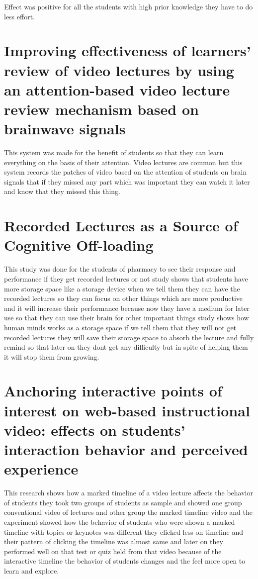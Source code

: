 \documentclass[12pt]{article}
\begin{document}
Effect was positive for all the students with high prior knowledge they have to do less effort.


\section{Improving effectiveness of learners’ review of video lectures by using an attention-based video lecture review mechanism based on brainwave signals}
This system was made for the benefit of students so that they can learn everything on the basis of their attention. Video lectures are common but this system records the patches of video based on the attention of students on brain signals that if they missed any part which was important they can watch it later and know that they missed this thing.




\section{Recorded Lectures as a Source of Cognitive Off-loading}
This study was done for the students of pharmacy to see their response and performance if they get recorded lectures or not study shows that students have more storage space like a storage device when we tell them they can have the recorded lectures so they can focus on other things which are more productive and it will increase their performance because now they have a medium for later use so that they can use their brain for other important things study shows how human minds works as a storage space if we tell them that they will not get recorded lectures they will save their storage space to absorb the lecture and fully remind so that later on they dont get any difficulty but in spite of helping them it will stop them from growing.

\section{Anchoring interactive points of interest on web-based instructional video: effects on students’ interaction behavior and perceived experience}  
This research shows how a marked timeline of a video lecture affects the behavior of students they took two groups of students as sample and showed one group conventional video of lectures and other group the marked timeline video and the experiment showed how the behavior of students who were shown a marked timeline with topics or keynotes was different they clicked less on timeline and their pattern of clicking the timeline was almost same and later on they performed well on that test or quiz held from that video because of the interactive timeline the behavior of students changes and the feel more open to learn and explore.
\end{document}
